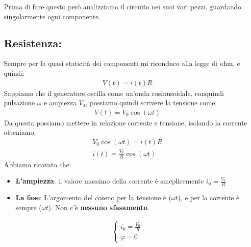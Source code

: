 \documentclass[a4paper, oneside]{article}
\begin{document}
Prima di fare questo però analizziamo il circuito nei suoi vari pezzi, guardando singolarmente ogni componente.\\
\subsection*{Resistenza:}
\begin{center}
\end{center}
Sempre per la quasi staticità dei componenti mi riconduco alla legge di ohm, e quindi:
\begin{gather*}
    V(t) = i(t) R
\end{gather*}
Sappiamo che il generatore oscilla come un'onda cosinusoidale, conquindi pulsazione $\omega$ e ampiezza $V_0$, possiamo quindi scrivere la tensione come:
\begin{gather*}
    V(t) = V_0 \cos(\omega t)
\end{gather*}
Da questa possiamo mettere in relazione corrente e tensione, isolando la corrente otteniamo:
\begin{gather*}
    V_0 \cos(\omega t) = i(t) R\\
    i(t) = \frac{V_0}{R} \cos(\omega t)
\end{gather*}
Abbiamo ricavato che:
\begin{itemize}
    \item \textbf{L'ampiezza}: il valore massimo della corrente è smeplicemente $i_0 = \frac{V_0}{R}$
    \item \textbf{La fase}: L'argomento del coseno per la tensione è ($\omega t$), e per la corrente è sempre ($\omega t$). Non c'è \textbf{nessuno sfasamento}.
\end{itemize}
\begin{gather*}
    \begin{cases}
        i_0 = \frac{V_0}{R}\\
        \varphi = 0
    \end{cases}
\end{gather*}
\end{document}
